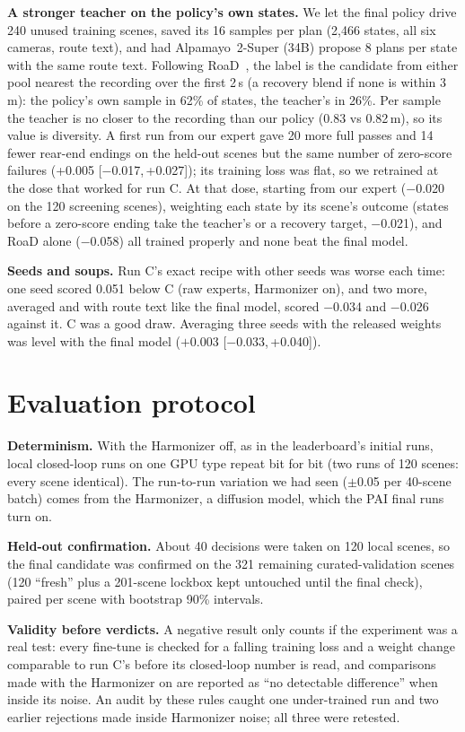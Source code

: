 \documentclass{article}
\begin{document}
\textbf{A stronger teacher on the policy's own states.} We let the final policy drive 240 unused training scenes,
saved its 16 samples per plan (2{,}466 states, all six cameras, route text), and had Alpamayo~2-Super (34B) propose 8
plans per state with the same route text. Following RoaD~\cite{road}, the label is the candidate from either pool nearest
the recording over the first 2\,s (a recovery blend if none is within 3\,m): the policy's own sample in 62\% of states,
the teacher's in 26\%. Per sample the teacher is no closer to the recording than our policy (0.83 vs 0.82\,m), so its
value is diversity. A first run from our expert gave 20 more full passes and 14 fewer rear-end endings on the held-out
scenes but the same number of zero-score failures (+0.005 [$-$0.017,\,+0.027]); its training loss was flat, so we
retrained at the dose that worked for run C. At that dose, starting from our expert ($-$0.020 on the 120 screening
scenes), weighting each state by its scene's outcome (states before a zero-score ending take the teacher's or a
recovery target, $-$0.021), and RoaD alone ($-$0.058) all trained properly and none beat the final model.

\textbf{Seeds and soups.} Run C's exact recipe with other seeds was worse each time: one seed scored 0.051 below C
(raw experts, Harmonizer on), and two more, averaged and with route text like the final model, scored $-$0.034 and
$-$0.026 against it. C was a good draw. Averaging three seeds with the released weights was level with the final model
($+$0.003 [$-$0.033,\,+0.040]).

\section{Evaluation protocol}
\textbf{Determinism.} With the Harmonizer off, as in the leaderboard's initial runs, local closed-loop runs on one GPU
type repeat bit for bit (two runs of 120 scenes: every scene identical). The run-to-run variation we had seen
($\pm$0.05 per 40-scene batch) comes from the Harmonizer, a diffusion model, which the PAI final runs turn on.

\textbf{Held-out confirmation.} About 40 decisions were taken on 120 local scenes, so the final candidate was confirmed on
the 321 remaining curated-validation scenes (120 ``fresh'' plus a 201-scene lockbox kept untouched until the final
check), paired per scene with bootstrap 90\% intervals.

\textbf{Validity before verdicts.} A negative result only counts if the experiment was a real test: every fine-tune is
checked for a falling training loss and a weight change comparable to run C's before its closed-loop number is read,
and comparisons made with the Harmonizer on are reported as ``no detectable difference'' when inside its noise.
An audit by these rules caught one under-trained run and two earlier rejections made inside Harmonizer noise; all three
were retested.
\end{document}
